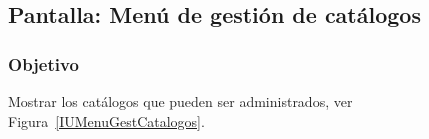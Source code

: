 
\subsection{Pantalla: Menú de gestión de catálogos}

\subsubsection{Objetivo}
	Mostrar los catálogos que pueden ser administrados, ver Figura~\ref{IUMenuGestCatalogos}. 






